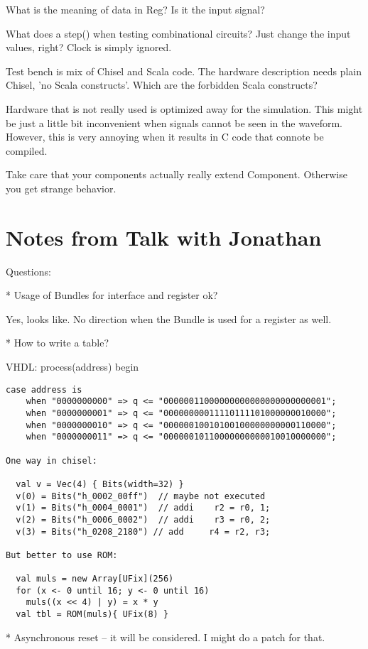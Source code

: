 \documentclass[a4paper, conference]{IEEEtran}
\begin{document}
What is the meaning of data in Reg? Is it the input signal?

What does a step() when testing combinational circuits? Just change the input values, right? Clock is simply ignored.

Test bench is mix of Chisel and Scala code. The hardware description needs plain Chisel, 'no Scala constructs'. Which are the forbidden Scala constructs?

Hardware that is not really used is optimized away for the simulation.
This might be just a little bit inconvenient when signals cannot be seen in
the waveform. However, this is very annoying when it results in C code
that connote be compiled.

Take care that your components actually really extend Component. Otherwise
you get strange behavior.

\section{Notes from Talk with Jonathan}

Questions:

* Usage of Bundles for interface and register ok?

Yes, looks like. No direction when the Bundle is used for a register as well.

* How to write a table?

VHDL:
process(address) begin

\begin{verbatim}
case address is
    when "0000000000" => q <= "00000011000000000000000000000001";
    when "0000000001" => q <= "00000000011110111101000000010000";
    when "0000000010" => q <= "00000010010100100000000000110000";
    when "0000000011" => q <= "00000010110000000000010010000000";

One way in chisel:

  val v = Vec(4) { Bits(width=32) }
  v(0) = Bits("h_0002_00ff")  // maybe not executed
  v(1) = Bits("h_0004_0001")  // addi    r2 = r0, 1;
  v(2) = Bits("h_0006_0002")  // addi    r3 = r0, 2;
  v(3) = Bits("h_0208_2180") // add     r4 = r2, r3;

But better to use ROM:

  val muls = new Array[UFix](256)
  for (x <- 0 until 16; y <- 0 until 16)
    muls((x << 4) | y) = x * y
  val tbl = ROM(muls){ UFix(8) }

\end{verbatim}

* Asynchronous reset -- it will be considered. I might do a patch for that.
\end{document}
